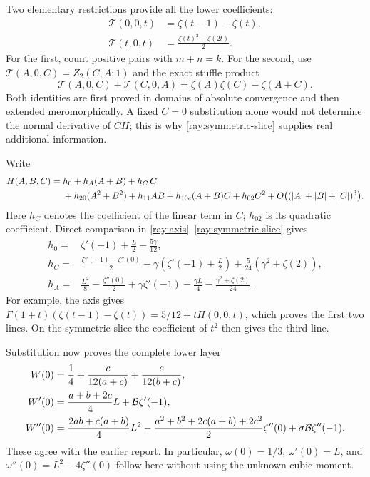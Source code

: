 \documentclass[11pt]{article}
\numberwithin{equation}{section}
\theoremstyle{definition}
\theoremstyle{remark}
\newcommand{\T}{\mathcal T}
\begin{document}
Two elementary restrictions provide all the lower coefficients:
\begin{align}
 \T(0,0,t)&=\zeta(t-1)-\zeta(t),\label{ray:axis}\\
 \T(t,0,t)&=\frac{\zeta(t)^2-\zeta(2t)}2.\label{ray:symmetric-slice}
\end{align}
For the first, count positive pairs with $m+n=k$. For the second,
use $\T(A,0,C)=Z_2(C,A;1)$ and the exact stuffle product
\begin{equation}\label{ray:stuffle-slice}
 \T(A,0,C)+\T(C,0,A)=\zeta(A)\zeta(C)-\zeta(A+C).
\end{equation}
Both identities are first proved in domains of absolute convergence
and then extended meromorphically. A fixed $C=0$ substitution alone
would not determine the normal derivative of $CH$; this is why
\eqref{ray:symmetric-slice} supplies real additional information.

Write
\begin{align}
 H(A,B,C)={}&h_0+h_A(A+B)+h_C\,C\notag\\
 &+h_{20}(A^2+B^2)+h_{11}AB+h_{10c}(A+B)C+h_{02}C^2
 +O\bigl((|A|+|B|+|C|)^3\bigr).
 \label{ray:H-Taylor}
\end{align}
Here $h_C$ denotes the coefficient of the linear term in $C$;
$h_{02}$ is its quadratic coefficient. Direct comparison in
\eqref{ray:axis}--\eqref{ray:symmetric-slice} gives
\begin{align}
 h_0={}&\zeta'(-1)+\frac L2-\frac{5\gamma}{12},\label{ray:h0}\\
 h_C={}&\frac{\zeta''(-1)-\zeta''(0)}2
       -\gamma\left(\zeta'(-1)+\frac L2\right)
       +\frac5{24}(\gamma^2+\zeta(2)),\label{ray:hC}\\
 h_A={}&\frac{L^2}{8}-\frac{\zeta''(0)}2+
       \gamma\zeta'(-1)-\frac{\gamma L}{4}
       -\frac{\gamma^2+\zeta(2)}{24}.
 \label{ray:hA}
\end{align}
For example, the axis gives
$\Gamma(1+t)(\zeta(t-1)-\zeta(t))=5/12+tH(0,0,t)$,
which proves the first two lines. On the symmetric slice the
coefficient of $t^2$ then gives the third line.

Substitution now proves the complete lower layer
\begin{align}
 W(0)&=\frac14+\frac{c}{12(a+c)}+\frac{c}{12(b+c)},\notag\\
 W'(0)&=\frac{a+b+2c}{4}L+\mathcal B\zeta'(-1),\notag\\
 W''(0)&=\frac{2ab+c(a+b)}4L^2
 -\frac{a^2+b^2+2c(a+b)+2c^2}{2}\zeta''(0)
 +\sigma\mathcal B\zeta''(-1).
 \label{ray:lower}
\end{align}
These agree with the earlier report. In particular,
 $\omega(0)=1/3$, $\omega'(0)=L$, and
$\omega''(0)=L^2-4\zeta''(0)$ follow here without using the
unknown cubic moment.
\end{document}
